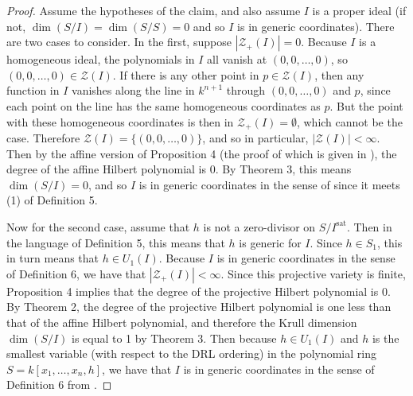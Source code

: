 \documentclass[11pt]{article}
\newcommand{\sat}{^{\text{sat}}}
\theoremstyle{definition}
\begin{document}
\begin{proof}
	Assume the hypotheses of the claim, and also assume $I$ is a proper ideal (if not, $\dim(S/I) = \dim(S/S) = 0$ and so $I$ is in generic coordinates). There are two cases to consider. In the first, suppose $|\mathcal{Z}_+(I)| = 0$. Because $I$ is a homogeneous ideal, the polynomials in $I$ all vanish at $(0,0, \dots, 0)$, so $(0,0,\dots,0) \in \mathcal{Z}(I)$. If there is any other point in $p \in \mathcal{Z}(I)$, then any function in $I$ vanishes along the line in $k^{n+1}$ through $(0,0,\dots,0)$ and $p$, since each point on the line has the same homogeneous coordinates as $p$. But the point with these homogeneous coordinates is then in $\mathcal{Z}_+(I) = \emptyset$, which cannot be the case. Therefore $\mathcal{Z}(I) = \{(0,0,\dots,0)\}$, and so in particular, $|\mathcal{Z}(I)| < \infty$. Then by the affine version of Proposition 4 (the proof of which is given in \cite{cox2013ideals}), the degree of the affine Hilbert polynomial is 0. By Theorem 3, this means $\dim(S/I) = 0$, and so $I$ is in generic coordinates in the sense of \cite{bayer1987criterion} since it meets (1) of Definition 5. 

	Now for the second case, assume that $h$ is not a zero-divisor on $S/I\sat$. Then in the language of Definition 5, this means that $h$ is generic for $I$. Since $h \in S_1$, this in turn means that $h \in U_1(I)$. Because $I$ is in generic coordinates in the sense of Definition 6, we have that $|\mathcal{Z}_+(I)| < \infty$. Since this projective variety is finite, Proposition 4 implies that the degree of the projective Hilbert polynomial is 0. By Theorem 2, the degree of the projective Hilbert polynomial is one less than that of the affine Hilbert polynomial, and therefore the Krull dimension $\dim(S/I)$ is equal to 1 by Theorem 3. Then because $h \in U_1(I)$ and $h$ is the smallest variable (with respect to the DRL ordering) in the polynomial ring $S = k[x_1, \dots, x_n, h]$, we have that $I$ is in generic coordinates in the sense of Definition 6 from \cite{bayer1987criterion}. 
\end{proof}








\newpage


\end{document}

